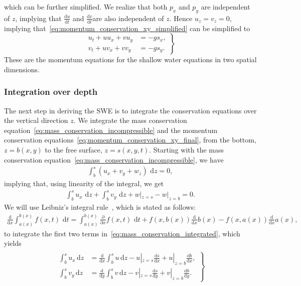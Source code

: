 which can be further simplified.
We realize that both $p_x$ and $p_y$ are independent of $z$, implying that $\frac{\text{d}u}{\text{d}t} $ and $\frac{\text{d}v}{\text{d}t} $are also independent of $z$.
Hence $u_z = v_z = 0$, implying that~\eqref{eq:momentum_conservation_xy_simplified} can be simplified to
\begin{equation}\label{eq:momentum_conservation_xy_final}
    \left.
    \begin{aligned}
        u_t + u u_x + v u_y &= -g s_x,  \\
        v_t + u v_x + v v_y &= -g s_y.
    \end{aligned}
    \right\}
\end{equation}
These are the momentum equations for the shallow water equations in two spatial dimensions.

\subsubsection*{Integration over depth}
The next step in deriving the SWE is to integrate the conservation equations over the vertical direction $z$.
We integrate the mass conservation equation~\eqref{eq:mass_conservation_incompressible} and the momentum conservation equations~\eqref{eq:momentum_conservation_xy_final}, from the bottom, $z = b(x,y)$ to the free surface, $z = s(x,y,t)$.
Starting with the mass conservation equation~\eqref{eq:mass_conservation_incompressible}, we have
\begin{align*}
    \int_{b}^{s} \left( u_x + v_y + w_z \right) \text{ d} z = 0,
\end{align*}
implying that, using linearity of the integral, we get
\begin{align}\label{eq:mass_conservation_integrated}
    \int_{b}^{s} u_x \text{ d} z + \int_{b}^{s} v_y \text{ d} z  + w|_{z = s} - w|_{z = b} = 0.
\end{align}
We will use Leibniz's integral rule~\cite{Leibniz}, which is stated as follows:
\begin{align}\label{eq:leibniz_rule}
    \frac{\text{d}}{\text{d} x} \int_{a(x)}^{b(x)} f(x,t) \text{ d} t
    = \int_{a(x)}^{b(x)} \frac{\partial }{\partial x} f(x, t) \text{ d} t + f(x, b(x)) \frac{\text{d}}{\text{d} x} b(x) - f(x, a(x)) \frac{\text{d}}{\text{d} x} a(x),
\end{align}
to integrate the first two terms in~\eqref{eq:mass_conservation_integrated}, which yields
\begin{align}\label{eq:leibniz_rule_applied}
    \begin{gathered}
        \left.
        \begin{aligned}
        \int_{b}^{s} u_x \, \text{d} z &=  \frac{\text{d}}{\text{d} x}  \int_{b}^{s} u \, \text{d} z  - u|_{z = s} \frac{\text{d} s}{\text{d} x} + u|_{z = b} \frac{\text{d} b}{\text{d} x}, \\
        \int_{b}^{s} v_y \, \text{d} z &=  \frac{\text{d}}{\text{d} y}  \int_{b}^{s} v \, \text{d} z  - v|_{z = s} \frac{\text{d} s}{\text{d} y} + v|_{z = b} \frac{\text{d} b}{\text{d} y}.
        \end{aligned}
        \right\}
    \end{gathered}
\end{align}
